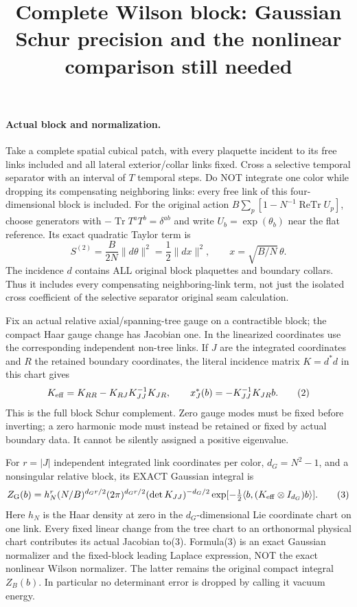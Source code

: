 \documentclass[11pt]{article}
\title{Complete Wilson block: Gaussian Schur precision and the nonlinear comparison still needed}\author{}\date{}
\begin{document}
\maketitle
\paragraph{Actual block and normalization.}
Take a complete spatial cubical patch, with every plaquette incident to its
free links included and all lateral exterior/collar links fixed. Cross a
selective temporal separator with an interval of $T$ temporal steps. Do NOT
integrate one color while dropping its compensating neighboring links: every
free link of this four-dimensional block is included. For the original action
$B\sum_p[1-N^{-1}\operatorname{ReTr}U_p]$, choose generators with
$-\operatorname{Tr}T^aT^b=\delta^{ab}$ and write $U_b=\exp(\theta_b)$ near the
flat reference. Its exact quadratic Taylor term is
\[
 S^{(2)}=\frac B{2N}\|d\theta\|^2=\frac12\|d x\|^2,
 \qquad x=\sqrt{B/N}\,\theta.                                          \tag{1}
\]
The incidence $d$ contains ALL original block plaquettes and boundary collars.
Thus it includes every compensating neighboring-link term, not just the
isolated cross coefficient of the selective separator original seam calculation.

Fix an actual relative axial/spanning-tree gauge on a contractible block; the
compact Haar gauge change has Jacobian one. In the linearized coordinates use
the corresponding independent non-tree links. If $J$ are the integrated
coordinates and $R$ the retained boundary coordinates, the literal incidence
matrix $K=d^*d$ in this chart gives
\[
 K_{\rm eff}=K_{RR}-K_{RJ}K_{JJ}^{-1}K_{JR},\qquad
 x_J^*(b)=-K_{JJ}^{-1}K_{JR}b.                                         \tag{2}
\]
This is the full block Schur complement. Zero gauge modes must be fixed before
inverting; a zero harmonic mode must instead be retained or fixed by actual
boundary data. It cannot be silently assigned a positive eigenvalue.

For $r=|J|$ independent integrated link coordinates per color,
$d_G=N^2-1$, and a nonsingular relative block, its EXACT Gaussian integral is
\[
 Z_{\rm G}(b)=h_N^r (N/B)^{d_Gr/2}(2\pi)^{d_Gr/2}
             (\det K_{JJ})^{-d_G/2}
             \exp[-\tfrac12\langle b,(K_{\rm eff}\otimes I_{d_G})b\rangle]. \tag{3}
\]
Here $h_N$ is the Haar density at zero in the $d_G$-dimensional Lie coordinate
chart on one link. Every fixed linear change from the tree chart to an
orthonormal physical chart contributes its actual Jacobian to(3).
Formula(3) is an exact Gaussian normalizer and the
fixed-block leading Laplace expression, NOT the exact nonlinear Wilson
normalizer. The latter remains the original compact integral $Z_B(b)$.
In particular no determinant error is dropped by calling it vacuum energy.
\end{document}

